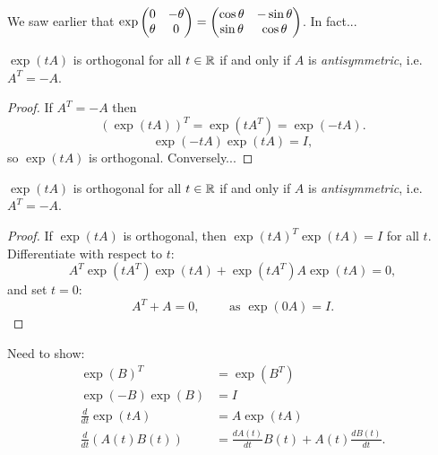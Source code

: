 \documentclass{beamer}
\begin{document}
\begin{frame}
We saw earlier that \(\exp\begin{pmatrix} 0 & -\theta \\ \theta & 0
\end{pmatrix}=\begin{pmatrix} \cos\theta & -\sin\theta \\ \sin\theta & \cos\theta\end{pmatrix}\). In
fact...


\begin{Theorem}
\(\exp(tA)\) is orthogonal for all \(t\in\mathbb{R}\) if and only if
\(A\) is {\em antisymmetric}, i.e. \(A^T=-A\).
\end{Theorem}
\begin{proof}
If \(A^T=-A\) then
\[(\exp(tA))^T=\exp(tA^T)=\exp(-tA).\]
\[\exp(-tA)\exp(tA)=I,\]
so \(\exp(tA)\) is orthogonal. Conversely...


\end{proof}
\end{frame}
\begin{frame}
\begin{Theorem}
\(\exp(tA)\) is orthogonal for all \(t\in\mathbb{R}\) if and only if
\(A\) is {\em antisymmetric}, i.e. \(A^T=-A\).
\end{Theorem}
\begin{proof}
If \(\exp(tA)\) is orthogonal, then \(\exp(tA)^T\exp(tA)=I\) for
all \(t\). Differentiate with respect to \(t\):
\[A^T\exp(tA^T)\exp(tA)+\exp(tA^T)A\exp(tA)=0,\]
and set \(t=0\):
\[A^T+A=0,\qquad\mbox{ as }\exp(0A)=I.\]


\end{proof}
\end{frame}
\begin{frame}
Need to show:
\begin{align*}
\exp(B)^T&=\exp(B^T)\\
\exp(-B)\exp(B)&=I\\
\frac{d}{dt}\exp(tA)&=A\exp(tA)\\
\frac{d}{dt}(A(t)B(t))&=\frac{dA(t)}{dt}B(t)+A(t)\frac{dB(t)}{dt}.
\end{align*}


\end{frame}
\end{document}
